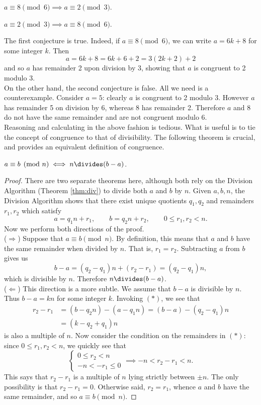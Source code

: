\begin{conj}
$a\equiv 8\pmod 6\implies a\equiv 2\pmod 3$.
\end{conj}

\begin{conj}
$a\equiv 2\pmod 3\implies a\equiv 8\pmod 6$.
\end{conj}

\noindent The first conjecture is true. Indeed, if $a\equiv 8\pmod 6$, we can write $a=6k+8$ for some integer $k$. Then
\[a=6k+8=6k+6+2=3(2k+2)+2\]
and so $a$ has remainder 2 upon division by 3, showing that $a$ is congruent to 2 modulo 3.\\
On the other hand, the second conjecture is false. All we need is a counterexample. Consider $a=5$: clearly $a$ is congruent to 2 modulo 3. However $a$ has remainder 5 on division by 6, whereas 8 has remainder 2. Therefore $a$ and 8 do not have the same remainder and are not congruent modulo 6.\\

\noindent Reasoning and calculating in the above fashion is tedious. What is useful is to tie the concept of congruence to that of divisibility. The following theorem is crucial, and provides an equivalent definition of congruence. 

\begin{thm}\label{thm:congdiv}
$a\equiv b\pmod n\iff n\divides (b-a)$.
\end{thm}

\begin{proof}
There are two separate theorems here, although both rely on the Division Algorithm (Theorem \ref{thm:div}) to divide both $a$ and $b$ by $n$. Given $a,b,n$, the Division Algorithm shows that there exist unique quotients $q_1,q_2$ and remainders $r_1,r_2$ which satisfy
\[a=q_1n+r_1,\qquad b=q_2n+r_2,\qquad 0\le r_1,r_2<n.\tag*{$(\ast)$}\]
Now we perform both directions of the proof.\\[5pt]
($\Rightarrow$) Suppose that $a\equiv b\pmod n$. By definition, this means that $a$ and $b$ have the same remainder when divided by $n$. That is, $r_1=r_2$. Subtracting $a$ from $b$ gives us
\[b-a=(q_2-q_1)n+(r_2-r_1)=(q_2-q_1)n,\]
which is divisible by $n$. Therefore $n\divides(b-a)$.\\[5pt]
($\Leftarrow$) This direction is a more subtle. We assume that $b-a$ is divisible by $n$. Thus $b-a=kn$ for some integer $k$. Invoking $(\ast)$, we see that
\begin{align*}
r_2-r_1&=(b-q_2n)-(a-q_1n)=(b-a)-(q_2-q_1)n\\
&=(k-q_2+q_1)n
\end{align*}
is also a multiple of $n$. Now consider the condition on the remainders in $(\ast)$: since $0\le r_1,r_2<n$, we quickly see that
\[\begin{cases}
0\le r_2<n\\
-n<-r_1\le 0
\end{cases}\implies -n<r_2-r_1<n.\]
This says that $r_2-r_1$ is a multiple of $n$ lying strictly between $\pm n$. The only possibility is that $r_2-r_1=0$. Otherwise said, $r_2=r_1$, whence $a$ and $b$ have the same remainder, and so $a\equiv b\pmod n$.
\end{proof}

